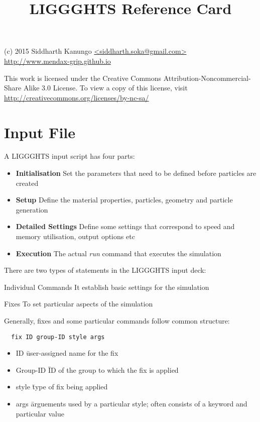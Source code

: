 \documentclass[8pt]{extarticle} %
\begin{document}
\raggedright

\begin{multicols}{3}

\title{LIGGGHTS Reference Card}

{\small
(c) 2015 Siddharth Kanungo \url{<siddharth.soka@gmail.com>}\\
\url{http://www.mendax-grip.github.io}

This work is licensed under the Creative Commons Attribution-Noncommercial-Share
Alike 3.0 License. To view a copy of this license, visit
\url{http://creativecommons.org/licenses/by-nc-sa/}
}

\vspace*{1pt}

\section{Input File}
A LIGGGHTS input script has four parts:
\begin{itemize}
\item \textbf{Initialisation}
  Set the parameters that need to be defined before particles are created
\item \textbf{Setup}
  Define the material properties, particles, geometry and particle generation
\item \textbf{Detailed Settings}
  Define some settings that correspond to speed and memory utilisation, output options etc
\item \textbf{Execution}
  The actual \textit{run} command that executes the simulation
\end{itemize}

There are two types of statements in the LIGGGHTS input deck:
\begin{list}{Type of Commands}{}
\item Individual Commands
  It establish basic settings for the simulation
\item Fixes
  To set particular aspects of the simulation
\end{list}

Generally, fixes and some particular commands follow common structure:
\begin{verbatim}
  fix ID group-ID style args
\end{verbatim}
\begin{itemize}
\item ID \= user-assigned name for the fix
\item Group-ID \= ID of the group to which the fix is applied
\item style \= type of fix being applied
\item args \= arguements used by a particular style; often consists of a keyword and particular value
\end{itemize}
\vspace{1ex}


\end{multicols}
\end{document}
